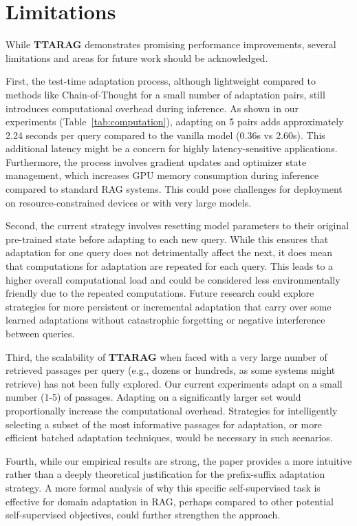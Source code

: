 \documentclass{article}
\newcommand{\ourmethod}{{\fontfamily{lmtt}\selectfont \textbf{TTARAG}}\xspace}
\begin{document}
\iffalse
\section*{Limitations}
While \ourmethod demonstrates promising performance improvements, several limitations and areas for future work should be acknowledged.

First, the test-time adaptation process, although lightweight compared to methods like Chain-of-Thought for a small number of adaptation pairs, still introduces computational overhead during inference. As shown in our experiments (Table~\ref{tab:computation}), adapting on 5 pairs adds approximately 2.24 seconds per query compared to the vanilla model (0.36s vs 2.60s). This additional latency might be a concern for highly latency-sensitive applications. Furthermore, the process involves gradient updates and optimizer state management, which increases GPU memory consumption during inference compared to standard RAG systems. This could pose challenges for deployment on resource-constrained devices or with very large models.

Second, the current strategy involves resetting model parameters to their original pre-trained state before adapting to each new query. While this ensures that adaptation for one query does not detrimentally affect the next, it does mean that computations for adaptation are repeated for each query. This leads to a higher overall computational load and could be considered less environmentally friendly due to the repeated computations. Future research could explore strategies for more persistent or incremental adaptation that carry over some learned adaptations without catastrophic forgetting or negative interference between queries.

Third, the scalability of \ourmethod when faced with a very large number of retrieved passages per query (e.g., dozens or hundreds, as some systems might retrieve) has not been fully explored. Our current experiments adapt on a small number (1-5) of passages. Adapting on a significantly larger set would proportionally increase the computational overhead. Strategies for intelligently selecting a subset of the most informative passages for adaptation, or more efficient batched adaptation techniques, would be necessary in such scenarios.

Fourth, while our empirical results are strong, the paper provides a more intuitive rather than a deeply theoretical justification for the prefix-suffix adaptation strategy. A more formal analysis of why this specific self-supervised task is effective for domain adaptation in RAG, perhaps compared to other potential self-supervised objectives, could further strengthen the approach.
\end{document}
